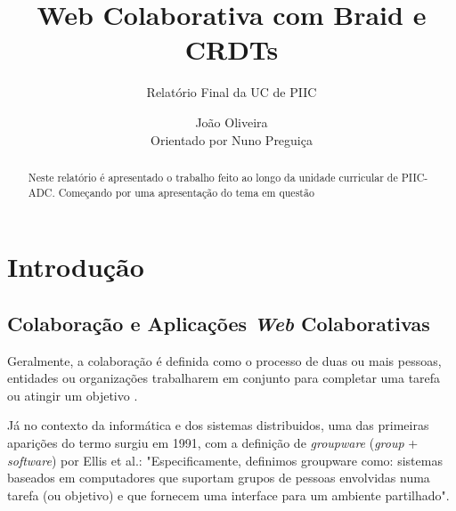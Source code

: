 \documentclass[runningheads]{llncs}
\begin{document}
%
    \title{Web Colaborativa com Braid e CRDTs} 
    \subtitle{Relatório Final da UC de PIIC}
    \author{João Oliveira\\Orientado por Nuno Preguiça}
    \maketitle              %
    \begin{abstract}
        Neste relatório é apresentado o trabalho feito ao longo da unidade
        curricular de PIIC-ADC. Começando por uma apresentação do tema em
        questão

    \end{abstract}
    \section{Introdução}

        \subsection{Colaboração e Aplicações {\itshape Web} Colaborativas}

        Geralmente, a colaboração é definida como o processo de duas ou mais
        pessoas, entidades ou organizações trabalharem em conjunto para
        completar uma tarefa ou atingir um objetivo \cite{collab-def}. 
        
        Já no contexto da informática e dos sistemas distribuidos, uma das
        primeiras aparições do termo surgiu em 1991, com a definição de
        {\itshape groupware} ({\itshape group} + {\itshape software}) por Ellis
        et al.: "Especificamente, definimos groupware como: sistemas baseados em
        computadores que suportam grupos de pessoas envolvidas numa tarefa (ou
        objetivo) e que fornecem uma interface para um ambiente
        partilhado"\cite{groupware-def}. 
\end{document}
